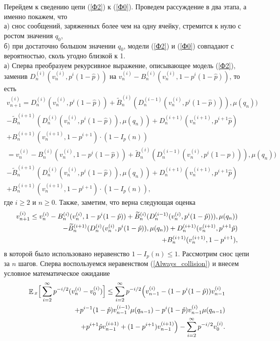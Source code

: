 \documentclass[10pt, reqno]{amsart}
\DeclareMathOperator*{\E}{\mathbb{E}}
\begin{document}
Перейдем к сведению цепи (\ref{Ф2}) к (\ref{Ф0}). Проведем рассуждение в два этапа, а именно покажем, что\\
а) снос сообщений, заряженных более чем на одну ячейку, стремится к нулю с ростом значения $q_{0}$,\\
б) при достаточно большом значении $q_{0}$, модели (\ref{Ф2}) и (\ref{Ф0}) совпадают с вероятностью, сколь угодно близкой к 1.\\
$ $
\\
а) Сперва преобразуем рекурсивное выражение, описывающее модель (\ref{Ф2}), заменив $D_{n}^{(i)}(v_{n}^{(i)}, p^{i}(1-\hat{p}))$ на $v_{n}^{(i)} - B_{n}^{(i)}(v_{n}^{(i)}, 1-p^{i}(1-\hat{p}))$, то есть
\begin{align*}
    v_{n+1}^{(i)} = D_{n}^{(i)}(v_{n}^{(i)}, p^{i}(1-\hat{p})) + \widetilde{B}_{n}^{(i)}(D_{n}^{(i-1)}(v_{n}^{(i)}, p^{i}(1-\hat{p}))), \mu(q_{n})) \\- \widetilde{B}_{n}^{(i+1)}(D_{n}^{(i)}(v_{n}^{(i)}, p^{i}(1-\hat{p})), \mu(q_{n})) + D_{n}^{(i+1)}(v_{n}^{(i+1)}, p^{i+1}\hat{p}) \\+ B_{n}^{(i+1)}(v_{n}^{(i+1)}, 1-p^{i+1})\cdot(1-I_{p}(n)) \\= v_{n}^{(i)} - B_{n}^{(i)}(v_{n}^{(i)}, 1-p^{i}(1-\hat{p})) + \widetilde{B}_{n}^{(i)}(D_{n}^{(i-1)}(v_{n}^{(i)}, p^{i}(1-\hat{p}))), \mu(q_{n})) \\- \widetilde{B}_{n}^{(i+1)}(D_{n}^{(i)}(v_{n}^{(i)}, p^{i}(1-\hat{p})), \mu(q_{n})) + D_{n}^{(i+1)}(v_{n}^{(i+1)}, p^{i+1}\hat{p}) \\+ B_{n}^{(i+1)}(v_{n}^{(i+1)}, 1-p^{i+1})\cdot(1-I_{p}(n)),
\end{align*}
где $i \geq 2$ и $n \geq 0$. Также, заметим, что верна следующая оценка
\begin{align}
    v_{n+1}^{(i)} \leq v_{n}^{(i)} - B_{n}^{(i)}(v_{n}^{(i)}, 1-p^{i}(1-\hat{p})) + \widetilde{B}_{n}^{(i)}(D_{n}^{(i-1)}(v_{n}^{(i)}, p^{i}(1-\hat{p}))), \mu(q_{n})) \notag\\- \widetilde{B}_{n}^{(i+1)}(D_{n}^{(i)}(v_{n}^{(i)}, p^{i}(1-\hat{p})), \mu(q_{n})) + D_{n}^{(i+1)}(v_{n}^{(i+1)}, p^{i+1}\hat{p}) \notag\\+ B_{n}^{(i+1)}(v_{n}^{(i+1)}, 1-p^{i+1}),
    \label{Always_collision}
\end{align}
в которой было использовано неравенство $1 - I_{p}(n) \leq 1$.
Рассмотрим снос цепи за $n$ шагов. Сперва воспользуемся неравенством (\ref{Always_collision}) и внесем условное математическое ожидание
\begin{align*}
    \E{}_{x}\Big[\sum_{i=2}^{\infty}p^{-i/2}(v_{n}^{(i)} - v_{0}^{(i)})\Big] \notag\leq \sum_{i=2}^{\infty}p^{-i/2}\Big(v_{n-1}^{(i)} - (1 - p^{i}(1 - \hat{p}))v_{n-1}^{(i)} \\+ p^{i-1}(1-\hat{p})v_{n-1}^{(i-1)}\mu(q_{n-1}) - p^{i}(1-\hat{p})v_{n-1}^{(i)}\mu(q_{n-1}) \\+ p^{i+1}\hat{p}v_{n-1}^{(i+1)} + (1-p^{i+1})v_{n-1}^{(i+1)}\Big)-  \sum_{i=2}^{\infty}p^{-i/2}v_{0}^{(i)}.
\end{align*}
\end{document}
